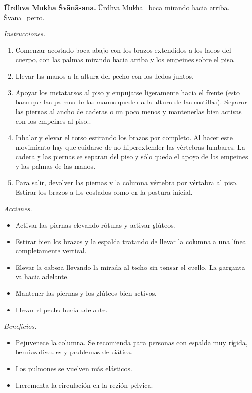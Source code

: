 \medskip\noindent\textbf{Ūrdhva Mukha
Śvānāsana.}
Ūrdhva Mukha=boca mirando hacia arriba.
Śvāna=perro.

\emph{Instrucciones.}
\begin{enumerate}
\item Comenzar acostado boca abajo con los
brazos extendidos a los lados del cuerpo, con
las palmas mirando hacia arriba y los
empeines sobre el piso.
\item Llevar las manos a la altura del pecho
con los dedos juntos.
\item Apoyar los metatarsos al piso y
empujarse ligeramente hacia el frente (esto
hace que las palmas de las manos queden a la
altura de las costillas). Separar las piernas
al ancho de caderas o un poco menos y
mantenerlas bien activas con los empeines al
piso..
\item Inhalar y elevar el torso estirando los
brazos por completo. Al hacer este movimiento
hay que cuidarse de no hiperextender las
vértebras lumbares. La cadera y las piernas
se separan del piso y sólo queda el apoyo de
los empeines y las palmas de las manos.
\item Para salir, devolver las piernas y la
columna vértebra por vértabra al piso.
Estirar los brazos a los costados como en la
postura inicial.
\end{enumerate}

\emph{Acciones.}
\begin{itemize}
\item Activar las piernas elevando rótulas y
activar glúteos.
\item Estirar bien los brazos y la espalda
tratando de llevar la columna a una línea
completamente vertical.
\item Elevar la cabeza llevando la mirada al
techo sin tensar el cuello. La garganta va
hacia adelante.
\item Mantener las piernas y los glúteos bien
activos.
\item Llevar el pecho hacia adelante.
\end{itemize}

\emph{Beneficios.}
\begin{itemize}
\item Rejuvenece la columna. Se recomienda
para personas con espalda muy rígida, hernias
discales y problemas de ciática.
\item Los pulmones se vuelven más elásticos.
\item Incrementa la circulación en la región
pélvica.
\end{itemize}

